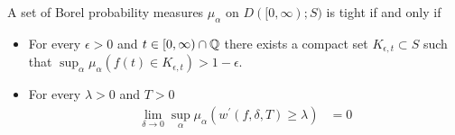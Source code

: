 \begin{thm}\label{SkorohodInfiniteTightnessInJ1Topology}A set of Borel probability measures $\mu_\alpha$ on $D([0,\infty); S)$ is tight if and only if 
\begin{itemize}
\item[(i)]For every $\epsilon >0$ and $t \in [0,\infty) \cap \mathbb{Q}$ there exists a compact set $K_{\epsilon, t} \subset S$ such that $\sup_\alpha \mu_\alpha(f(t) \in K_{\epsilon, t}) > 1 - \epsilon$.
\item[(ii)] For every $\lambda > 0$ and $T > 0$ 
\begin{align*}
\lim_{\delta \to 0} \sup_\alpha \mu_\alpha(w^\prime(f, \delta, T) \geq \lambda) &= 0
\end{align*}
\end{itemize}
\end{thm}
